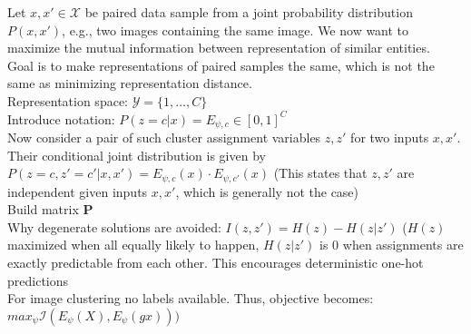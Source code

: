 \documentclass[]{article}
\begin{document}
Let $x, x' \in \mathcal{X}$ be paired data sample from a joint probability distribution $P(x,x')$, e.g., two images containing the same image. We now want to maximize the mutual information between representation of similar entities.\\
Goal is to make representations of paired samples the same, which is not the same as minimizing representation distance.\\
Representation space: $\mathcal{Y} = \{1,\dots,C\}$\\
Introduce notation: $P(z=c|x) = E_{\psi,c} \in [0,1]^C$\\
Now consider a pair of such  cluster assignment variables $z, z'$ for two inputs $x,x'$. Their conditional joint distribution is given by $P(z=c, z'=c'|x,x') = E_{\psi,c}(x) \cdot E_{\psi,c'}(x)$ (This states that $z, z'$ are independent given inputs $x,x'$, which is generally not the case)\\
Build matrix $\mathbf{P}$\\
Why degenerate solutions are avoided: $I(z,z') = H(z) - H(z|z')$ ($H(z)$ maximized when all equally likely to happen, $H(z|z')$ is $0$ when assignments are exactly predictable from each other. This encourages deterministic one-hot predictions\\
For image clustering no labels available. Thus, objective becomes: $max_\psi\mathcal{I}(E_\psi(X),E_\psi(gx)))$
\end{document}
